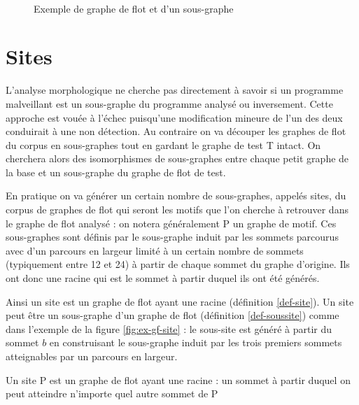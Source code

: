 \begin{figure}[ht]
\begin{center}
  \subfigure[Graphe de flot T]{
\label{fig:ex-gf}
\epsfig{figure=supports/algos/images/c_gTGF.pdf,height=3.5cm}}\quad
  \subfigure[Graphe de flot P, isomorphe à un sous-graphe de T]{
\label{fig:ex-sous-gf}
\epsfig{figure=supports/algos/images/c_gPGF.pdf,height=3cm}}\\
\end{center}
\caption{Exemple de graphe de flot et d'un sous-graphe}
\label{fig:ex-gf-sous-gf}
\end{figure}

\section{Sites}
L'analyse morphologique \cite{BKM08} ne cherche pas directement à savoir si un programme malveillant est un sous-graphe du programme analysé ou inversement. 
Cette approche est vouée à l'échec puisqu'une modification mineure de l'un des deux conduirait à une non détection.
Au contraire on va découper les graphes de flot du corpus en sous-graphes tout en gardant le graphe de test T intact.
On cherchera alors des isomorphismes de sous-graphes entre chaque petit graphe de la base et un sous-graphe du graphe de flot de test.

En pratique on va générer un certain nombre de sous-graphes, appelés sites, du corpus de graphes de flot qui seront les motifs que l'on cherche à retrouver dans le graphe de flot analysé : on notera généralement P un graphe de motif. 
Ces sous-graphes sont définis par le sous-graphe induit par les sommets parcourus avec d'un parcours en largeur limité à un certain nombre de sommets (typiquement entre 12 et 24) à partir de chaque sommet du graphe d'origine. Ils ont donc une racine qui est le sommet à partir duquel ils ont été générés.

Ainsi un site est un graphe de flot ayant une racine (définition \ref{def-site}). Un site peut être un sous-graphe d'un graphe de flot (définition \ref{def-soussite}) comme dans l'exemple de la figure \ref{fig:ex-gf-site} : le sous-site est généré à partir du sommet $b$ en construisant le sous-graphe induit par les trois premiers sommets atteignables par un parcours en largeur.

\begin{defi}\label{def-site}
Un site P est un graphe de flot ayant une racine : un sommet à partir duquel on peut atteindre n'importe quel autre sommet de P
\end{defi}


